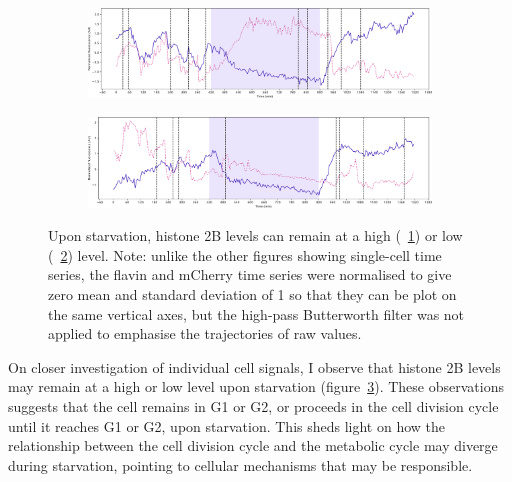 \begin{figure}
  \centering
  \begin{subfigure}[htpb]{1.0\textwidth}
   \centering
   \includegraphics[width=\textwidth]{starvation_raw_13-07-02.pdf}
   \caption{
   }
   \label{fig:biology-starvation-raw-1}
  \end{subfigure}

  \begin{subfigure}[htpb]{1.0\textwidth}
   \centering
   \includegraphics[width=\textwidth]{starvation_raw_13-39-01.pdf}
   \caption{
   }
   \label{fig:biology-starvation-raw-2}
  \end{subfigure}

  \caption{
    Upon starvation, histone 2B levels can remain at a high (~\ref{fig:biology-starvation-raw-1}) or low (~\ref{fig:biology-starvation-raw-2}) level.
    Note: unlike the other figures showing single-cell time series, the flavin and mCherry time series were normalised to give zero mean and standard deviation of 1 so that they can be plot on the same vertical axes, but the high-pass Butterworth filter was not applied to emphasise the trajectories of raw values.
  }
  \label{fig:biology-starvation-raw}
\end{figure}

On closer investigation of individual cell signals, I observe that histone 2B levels may remain at a high or low level upon starvation (figure~\ref{fig:biology-starvation-raw}).
These observations suggests that the cell remains in G1 or G2, or proceeds in the cell division cycle until it reaches G1 or G2, upon starvation.
This sheds light on how the relationship between the cell division cycle and the metabolic cycle may diverge during starvation, pointing to cellular mechanisms that may be responsible.


